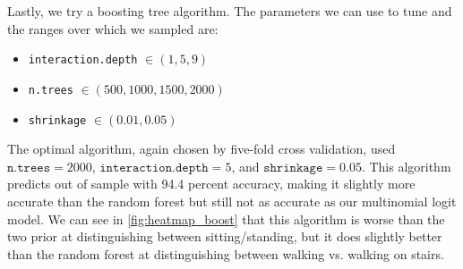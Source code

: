 Lastly, we try a boosting tree algorithm. The parameters we can use to tune and the ranges over which we sampled are:
\begin{itemize}
\item \texttt{interaction.depth} $\in (1, 5, 9)$
\item \texttt{n.trees} $\in (500, 1000, 1500, 2000)$
\item \texttt{shrinkage} $\in (0.01, 0.05)$
\end{itemize}
The optimal algorithm, again chosen by five-fold cross validation, used $\texttt{n.trees}=2000$, $\texttt{interaction.depth}=5$, and $\texttt{shrinkage}=0.05$. This algorithm predicts out of sample with 94.4 percent accuracy, making it slightly more accurate than the random forest but still not as accurate as our multinomial logit model. We can see in \cref{fig:heatmap_boost} that this algorithm is worse than the two prior at distinguishing between sitting/standing, but it does slightly better than the random forest at distinguishing between walking vs. walking on stairs.

